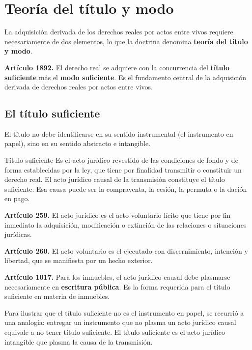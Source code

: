 \documentclass[12pt,oneside]{book}
\begin{document}
\section{Teoría del título y modo}

La adquisición derivada de los derechos reales por actos entre vivos requiere necesariamente de dos elementos, lo que la doctrina denomina \textbf{teoría del título y modo}.

\begin{important}
\textbf{Artículo 1892.} El derecho real se adquiere con la concurrencia del \textbf{título suficiente} más el \textbf{modo suficiente}. Es el fundamento central de la adquisición derivada de derechos reales por actos entre vivos.
\end{important}

\subsection{El título suficiente}

El título no debe identificarse en su sentido instrumental (el instrumento en papel), sino en su sentido abstracto e intangible.

\begin{definition}{Título suficiente}
Es el acto jurídico revestido de las condiciones de fondo y de forma establecidas por la ley, que tiene por finalidad transmitir o constituir un derecho real. El acto jurídico causal de la transmisión constituye el título suficiente. Esa causa puede ser la compraventa, la cesión, la permuta o la dación en pago.
\end{definition}

\textbf{Artículo 259.} El acto jurídico es el acto voluntario lícito que tiene por fin inmediato la adquisición, modificación o extinción de las relaciones o situaciones jurídicas.

\textbf{Artículo 260.} El acto voluntario es el ejecutado con discernimiento, intención y libertad, que se manifiesta por un hecho exterior.

\textbf{Artículo 1017.} Para los inmuebles, el acto jurídico causal debe plasmarse necesariamente en \textbf{escritura pública}. Es la forma requerida para el título suficiente en materia de inmuebles.

\begin{note}
Para ilustrar que el título suficiente no es el instrumento en papel, se recurrió a una analogía: entregar un instrumento que no plasma un acto jurídico causal equivale a no tener título suficiente. El título suficiente es el acto jurídico intangible que plasma la causa de la transmisión.
\end{note}
\end{document}
